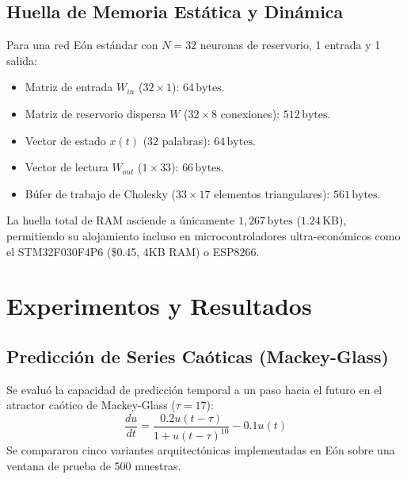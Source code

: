 \documentclass[10pt,twocolumn]{article}
\begin{document}
\subsection{Huella de Memoria Estática y Dinámica}

Para una red Eón estándar con $N=32$ neuronas de reservorio, 1 entrada y 1 salida:
\begin{itemize}
    \item Matriz de entrada $W_{in}$ ($32 \times 1$): $64\,\text{bytes}$.
    \item Matriz de reservorio dispersa $W$ ($32 \times 8$ conexiones): $512\,\text{bytes}$.
    \item Vector de estado $x(t)$ ($32$ palabras): $64\,\text{bytes}$.
    \item Vector de lectura $W_{out}$ ($1 \times 33$): $66\,\text{bytes}$.
    \item Búfer de trabajo de Cholesky ($33 \times 17$ elementos triangulares): $561\,\text{bytes}$.
\end{itemize}
La huella total de RAM asciende a únicamente \textbf{$1,267\,\text{bytes}$} ($1.24\,\text{KB}$), permitiendo su alojamiento incluso en microcontroladores ultra-económicos como el STM32F030F4P6 (\$0.45, 4KB RAM) o ESP8266.

\section{Experimentos y Resultados}

\subsection{Predicción de Series Caóticas (Mackey-Glass)}

Se evaluó la capacidad de predicción temporal a un paso hacia el futuro en el atractor caótico de Mackey-Glass ($\tau = 17$):
\begin{equation}
\frac{du}{dt} = \frac{0.2 u(t-\tau)}{1 + u(t-\tau)^{10}} - 0.1 u(t)
\end{equation}
Se compararon cinco variantes arquitectónicas implementadas en Eón sobre una ventana de prueba de 500 muestras.
\end{document}
